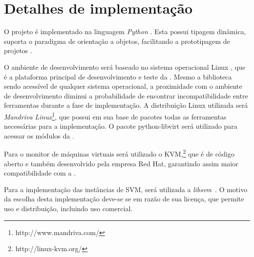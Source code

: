 \section{Detalhes de implementação}

O projeto é implementado na linguagem \emph{Python}
\cite{rossum1995python}.  Esta possui tipagem dinâmica, suporta o paradigma
de orientação a objetos, facilitando a prototipagem de projetos
\cite{lutz2006programming}.

O ambiente de desenvolvimento será baseado no sistema operacional Linux
\cite{morimoto2004entendendo}, que é a plataforma principal de
desenvolvimento e teste da \libvirt{}. Mesmo a biblioteca sendo acessível
de qualquer sistema operacional, a proximidade com o ambiente de
desenvolvimento diminui a probabilidade de encontrar incompatibilidade
entre ferramentas durante a fase de implementação. A distribuição Linux
utilizada será \emph{Mandriva Linux}\footnote{http://www.mandriva.com/},
que possui em sua base de pacotes todas as ferramentas necessárias para a
implementação. O pacote python-libvirt será utilizado para acessar
os módulos da \libvirt{}.

Para o monitor de máquinas virtuais será utilizado o
KVM,\footnote{http://linux-kvm.org/} que é de código aberto e também
desenvolvido pela empresa Red Hat, garantindo assim maior compatibilidade
com a \libvirt{}.

Para a implementação das instâncias de SVM, será utilizada a
\emph{libsvm}~\cite{chang2001libsvm}. O motivo da escolha desta
implementação deve-se se em razão de sua licença, que permite uso e
distribuição, incluindo uso comercial.
